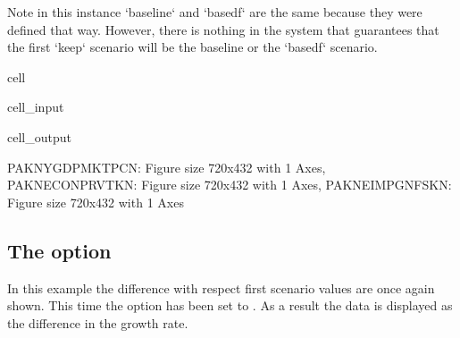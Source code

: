 \documentclass[letterpaper,10pt,english]{jupyterBook}
\begin{document}
\begin{sphinxVerbatim}[commandchars=\\\{\}]
Note in this instance `baseline` and `basedf` are the same because they were defined that way.  However, there is nothing in the system that guarantees that the first `keep` scenario will be the baseline or the `basedf` scenario.
\end{sphinxVerbatim}

\begin{sphinxuseclass}{cell}\begin{sphinxVerbatimInput}

\begin{sphinxuseclass}{cell_input}
\begin{sphinxVerbatim}[commandchars=\\\{\}]
  
\end{sphinxVerbatim}

\end{sphinxuseclass}\end{sphinxVerbatimInput}
\begin{sphinxVerbatimOutput}

\begin{sphinxuseclass}{cell_output}
\begin{sphinxVerbatim}[commandchars=\\\{\}]
\PYGZob{}\PYGZsq{}PAKNYGDPMKTPCN\PYGZsq{}: \PYGZlt{}Figure size 720x432 with 1 Axes\PYGZgt{},
 \PYGZsq{}PAKNECONPRVTKN\PYGZsq{}: \PYGZlt{}Figure size 720x432 with 1 Axes\PYGZgt{},
 \PYGZsq{}PAKNEIMPGNFSKN\PYGZsq{}: \PYGZlt{}Figure size 720x432 with 1 Axes\PYGZgt{}\PYGZcb{}
\end{sphinxVerbatim}

\end{sphinxuseclass}\end{sphinxVerbatimOutput}

\end{sphinxuseclass}

\subsection{The  option}
\label{\detokenize{content/05_WBModels/ScenarioAnalysis:the-showtype-option}}
\sphinxAtStartPar
In this example the difference with respect first  scenario  values are once again shown. This time the  option has been set to .  As a result the data is displayed as the  difference in the growth rate.
\end{document}
